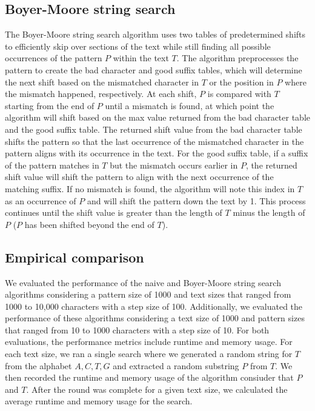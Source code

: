 \documentclass[11pt, letterpaper]{article}
\begin{document}
\subsection{Boyer-Moore string search}
The Boyer-Moore string search algorithm uses two tables of predetermined shifts to efficiently skip over sections of the text while still finding all possible occurrences of the
pattern $P$ within the text $T$. The algorithm preprocesses the pattern to create the bad character and good suffix tables, which will determine the next shift based on the mismatched character in $T$ or the position in $P$ where the mismatch happened, respectively. At each shift, $P$ is compared with $T$ starting from the end of $P$ until a mismatch is found, at which point the algorithm will shift based on the max value returned from the bad character table and the good suffix table.
The returned shift value from the bad character table shifts the pattern so that the last occurrence of the mismatched character in the pattern aligns with its occurrence in the text. For the good suffix table, if a suffix of the pattern matches in $T$ but the mismatch occurs earlier in $P$, the returned shift value will shift the pattern to align with the next occurrence of the matching suffix. If no mismatch is found, the algorithm will note this index in $T$ as an occurrence of $P$ and will shift the pattern down the text by 1. This process continues until the shift value is greater than the length of $T$ minus the length of $P$ ($P$ has been shifted beyond the end of $T$).

\subsection{Empirical comparison}

We evaluated the performance of the naive and Boyer-Moore string search algorithms considering a
pattern size of 1000 and text sizes that ranged from 1000 to 10,000 characters
with a step size of 100. Additionally, we evaluated the performance of these algorithms considering a text size of 1000 and pattern sizes that ranged from 10 to 1000 characters with a step size of 10.
For both evaluations, the performance metrics include runtime and memory
usage. For each text size, we ran a single search where we generated a random
string for $T$ from the alphabet ${A, C, T, G}$ and extracted a random
substring $P$ from $T$. We then recorded the runtime and memory usage of the
algorithm consiuder that $P$ and $T$. After the round was complete for a given
text size, we calculated the average runtime and memory usage for the search.
\end{document}
